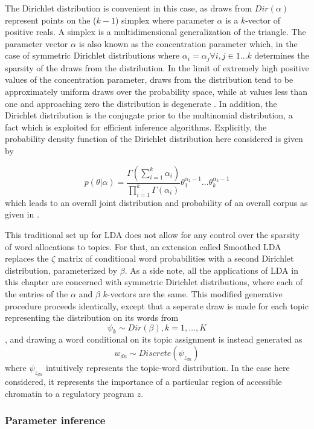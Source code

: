 The Dirichlet distribution is convenient in this case, as draws from $Dir(\alpha)$ represent points on the ($k-1$) simplex where parameter $\alpha$ is a $k$-vector of positive reals. A simplex is a multidimensional generalization of the triangle. The parameter vector $\alpha$ is also known as the concentration parameter which, in the case of symmetric Dirichlet distributions where $\alpha_i = \alpha_j \forall i,j \in 1 \ldots k$ determines the sparsity of the draws from the distribution. In the limit of extremely high positive values of the concentration parameter, draws from the distribution tend to be approximately uniform draws over the probability space, while at values less than one and approaching zero the distribution is degenerate \cite{Ferguson1991}.  In addition, the Dirichlet distribution is the conjugate prior to the multinomial distribution, a fact which is exploited for efficient inference algorithms. Explicitly, the probability density function of the Dirichlet distribution here considered is given by 

$$ p(\theta | \alpha ) = \frac{\Gamma(\sum^k_{i=1} \alpha_i)}{ \prod^k_{i=1} \Gamma(\alpha_i)} \theta_1^{\alpha_1 -1} \ldots \theta_k^{\alpha_k-1} $$ which leads to an overall joint distribution and probability of an overall corpus as given in \textcite{Blei2003}.

This traditional set up for LDA does not allow for any control over the sparsity of word allocations to topics. For that, an extension called Smoothed LDA replaces the $\zeta$ matrix of conditional word probabilities with a second Dirichlet distribution, parameterized by $\beta$. As a side note, all the applications of LDA in this chapter are concerned with symmetric Dirichlet distributions, where each of the entries of the $\alpha$ and $\beta$ $k$-vectors are the same. This modified generative procedure proceeds identically, except that a seperate draw is made for each topic representing the distribution on its words from $$ \psi_k \sim Dir(\beta), k = 1, \ldots, K $$, and drawing a word conditional on its topic assignment is instead generated as $$w_{dn} \sim Discrete( \psi_{z_{dn}})$$ where $\psi_{z_{dn}}$ intuitively represents the topic-word distribution. In the case here considered, it represents the importance of a particular region of accessible chromatin to a regulatory program $z$.

\subsubsection{Parameter inference}

